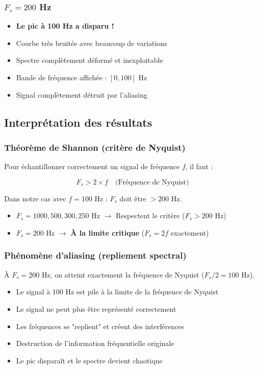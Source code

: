 \documentclass[12pt,a4paper]{article}
\begin{document}
\subsubsection{$F_s = 200$ Hz}
\begin{itemize}
    \item \textbf{Le pic à 100 Hz a disparu !}
    \item Courbe très bruitée avec beaucoup de variations
    \item Spectre complètement déformé et inexploitable
    \item Bande de fréquence affichée : $[0, 100]$ Hz
    \item Signal complètement détruit par l'aliasing
\end{itemize}

\subsection{Interprétation des résultats}

\subsubsection{Théorème de Shannon (critère de Nyquist)}

Pour échantillonner correctement un signal de fréquence $f$, il faut :

\begin{equation}
    \boxed{F_s > 2 \times f \quad \text{(Fréquence de Nyquist)}}
\end{equation}

Dans notre cas avec $f = 100$ Hz : $F_s$ doit être $> 200$ Hz.

\begin{itemize}
    \item[$\checkmark$] $F_s = 1000, 500, 300, 250$ Hz $\rightarrow$ Respectent le critère ($F_s > 200$ Hz)
    \item[$\times$] $F_s = 200$ Hz $\rightarrow$ \textbf{À la limite critique} ($F_s = 2f$ exactement)
\end{itemize}

\subsubsection{Phénomène d'aliasing (repliement spectral)}

À $F_s = 200$ Hz, on atteint exactement la fréquence de Nyquist ($F_s/2 = 100$ Hz).

\begin{itemize}
    \item Le signal à 100 Hz est pile à la limite de la fréquence de Nyquist
    \item Le signal ne peut plus être représenté correctement
    \item Les fréquences se "replient" et créent des interférences
    \item Destruction de l'information fréquentielle originale
    \item Le pic disparaît et le spectre devient chaotique
\end{itemize}
\end{document}

